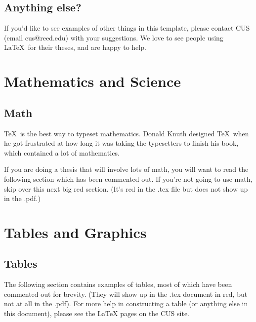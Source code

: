 \documentclass[12pt,twoside]{reedthesis}
\theoremstyle{plain}   %
\theoremstyle{definition}
\theoremstyle{remark}
\numberwithin{equation}{section}
\begin{document}
\section{Anything else?}
If you'd like to see examples of other things in this template, please contact CUS (email cus@reed.edu) with your suggestions. We love to see people using \LaTeX\ for their theses, and are happy to help.


\chapter{Mathematics and Science}	
\section{Math}
	\TeX\ is the best way to typeset mathematics. Donald Knuth designed \TeX\ when he got frustrated at how long it was taking the typesetters to finish his book, which contained a lot of mathematics. 
	
	If you are doing a thesis that will involve lots of math, you will want to read the following section which has been commented out. If you're not going to use math, skip over this next big red section. (It's red in the .tex file but does not show up in the .pdf.)

\chapter{Tables and Graphics}

\section{Tables}
	The following section contains examples of tables, most of which have been commented out for brevity. (They will show up in the .tex document in red, but not at all in the .pdf). For more help in constructing a table (or anything else in this document), please see the LaTeX pages on the CUS site. 
\end{document}
